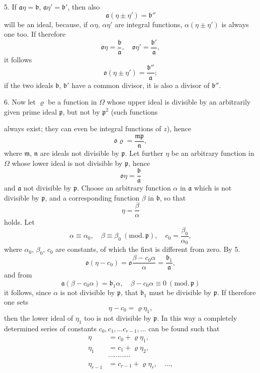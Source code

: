 \documentclass{article}
\begin{document}
5. If $\mathfrak{a}\eta = \mathfrak{b}$, $\mathfrak{a}\eta' = \mathfrak{b}'$, then also
\[ \mathfrak{a}(\eta \pm \eta') = \mathfrak{b}'' \]
will be an ideal, because, if $\alpha\eta$, $\alpha\eta'$ are integral functions, $\alpha(\eta \pm \eta')$ is always one too. If therefore
\[ \mathfrak{o}\eta = \frac{\mathfrak{b}}{\mathfrak{a}}, \quad \mathfrak{o}\eta' = \frac{\mathfrak{b}'}{\mathfrak{a}}, \]
it follows
\[ \mathfrak{o}(\eta \pm \eta') = \frac{\mathfrak{b}''}{\mathfrak{a}}; \]
if the two ideals $\mathfrak{b}$, $\mathfrak{b}'$ have a common divisor, it is also a divisor of $\mathfrak{b}''$.

6. Now let $\varrho$ be a function in $\Omega$ whose upper ideal is divisible by an arbitrarily given prime ideal $\mathfrak{p}$, but not by $\mathfrak{p}^{2}$ (such functions

always exist; they can even be integral functions of $z$), hence
\[ \mathfrak{o}\varrho = \frac{\mathfrak{m}\mathfrak{p}}{\mathfrak{n}}, \]
where $\mathfrak{m}$, $\mathfrak{n}$ are ideals not divisible by $\mathfrak{p}$. Let further $\eta$ be an arbitrary function in $\Omega$ whose lower ideal is not divisible by $\mathfrak{p}$, hence
\[ \mathfrak{o}\eta = \frac{\mathfrak{b}}{\mathfrak{a}} \]
and $\mathfrak{a}$ not divisible by $\mathfrak{p}$. Choose an arbitrary function $\alpha$ in $\mathfrak{a}$ which is not divisible by $\mathfrak{p}$, and a corresponding function $\beta$ in $\mathfrak{b}$, so that
\[ \eta = \frac{\beta}{\alpha} \]
holds. Let
\[ \alpha \equiv \alpha_{0}, \quad \beta \equiv \beta_{0} \ (\text{mod.}\,\mathfrak{p}), \quad c_{0} = \frac{\beta_{0}}{\alpha_{0}}, \]
where $\alpha_{0}$, $\beta_{0}$, $c_{0}$ are constants, of which the first is different from zero. By 5.
\[ \mathfrak{o}(\eta - c_{0}) = \mathfrak{o}\frac{\beta - c_{0}\alpha}{\alpha} = \frac{\mathfrak{b}_{1}}{\mathfrak{a}}, \]
and from
\[ \mathfrak{a}(\beta - c_{0}\alpha) = \mathfrak{b}_{1}\alpha, \quad \beta - c_{0}\alpha \equiv 0 \ (\text{mod.}\,\mathfrak{p}) \]
it follows, since $\alpha$ is not divisible by $\mathfrak{p}$, that $\mathfrak{b}_{1}$ must be divisible by $\mathfrak{p}$. If therefore one sets
\[ \eta - c_{0} = \varrho\eta_{1}, \]
then the lower ideal of $\eta_{1}$ too is not divisible by $\mathfrak{p}$. In this way a completely determined series of constants $c_{0}, c_{1}, \ldots c_{r-1}, \ldots$ can be found such that
\[ \begin{aligned} \eta &= c_{0} + \varrho\eta_{1}, \\ \eta_{1} &= c_{1} + \varrho\eta_{2}, \\ &\cdots\cdots\cdots\cdots \\ \eta_{r-1} &= c_{r-1} + \varrho\eta_{r}, \quad \ldots, \end{aligned} \]
\end{document}
